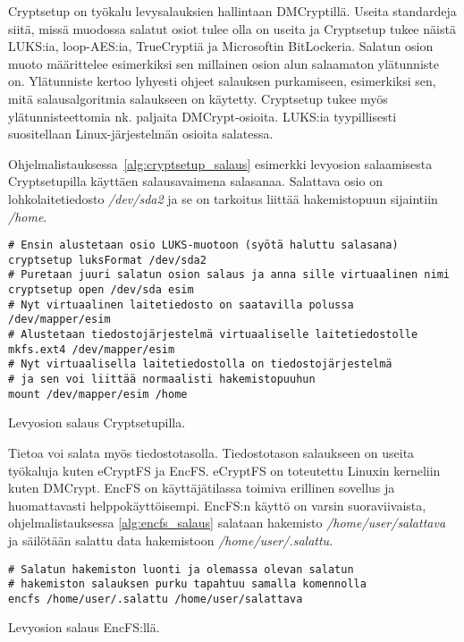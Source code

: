 Cryptsetup on työkalu levysalauksien hallintaan DMCryptillä. Useita standardeja siitä, missä muodossa salatut osiot tulee olla on useita ja Cryptsetup tukee näistä LUKS:ia, loop-AES:ia, TrueCryptiä ja Microsoftin BitLockeria. Salatun osion muoto määrittelee esimerkiksi sen millainen osion alun salaamaton ylätunniste on. Ylätunniste kertoo lyhyesti ohjeet salauksen purkamiseen, esimerkiksi sen, mitä salausalgoritmia salaukseen on käytetty. Cryptsetup tukee myös ylätunnisteettomia nk. paljaita DMCrypt-osioita. LUKS:ia tyypillisesti suositellaan Linux-järjestelmän osioita salatessa.

Ohjelmalistauksessa~\ref{alg:cryptsetup_salaus} esimerkki levyosion salaamisesta Cryptsetupilla käyttäen salausavaimena salasanaa. Salattava osio on lohkolaitetiedosto \textit{/dev/sda2} ja se on tarkoitus liittää hakemistopuun sijaintiin \textit{/home}.

\begin{algorithm}[tbh]
\begin{verbatim}
# Ensin alustetaan osio LUKS-muotoon (syötä haluttu salasana)
cryptsetup luksFormat /dev/sda2
# Puretaan juuri salatun osion salaus ja anna sille virtuaalinen nimi
cryptsetup open /dev/sda esim
# Nyt virtuaalinen laitetiedosto on saatavilla polussa /dev/mapper/esim
# Alustetaan tiedostojärjestelmä virtuaaliselle laitetiedostolle
mkfs.ext4 /dev/mapper/esim
# Nyt virtuaalisella laitetiedostolla on tiedostojärjestelmä
# ja sen voi liittää normaalisti hakemistopuuhun
mount /dev/mapper/esim /home
\end{verbatim}
\caption{Levyosion salaus Cryptsetupilla.\label{alg:cryptsetup_salaus}}
\end{algorithm}
\newpage{}

Tietoa voi salata myös tiedostotasolla. Tiedostotason salaukseen on useita työkaluja kuten eCryptFS ja EncFS. eCryptFS on toteutettu Linuxin kerneliin kuten DMCrypt. EncFS on käyttäjätilassa toimiva erillinen sovellus ja huomattavasti helppokäyttöisempi. EncFS:n käyttö on varsin suoraviivaista, ohjelmalistauksessa \ref{alg:encfs_salaus} salataan hakemisto \textit{/home/user/salattava} ja säilötään salattu data hakemistoon \textit{/home/user/.salattu}.

\begin{algorithm}[tbh]
\begin{verbatim}
# Salatun hakemiston luonti ja olemassa olevan salatun
# hakemiston salauksen purku tapahtuu samalla komennolla
encfs /home/user/.salattu /home/user/salattava
\end{verbatim}
\caption{Levyosion salaus EncFS:llä.\label{alg:encfs_salaus}}
\end{algorithm}
\newpage{}

